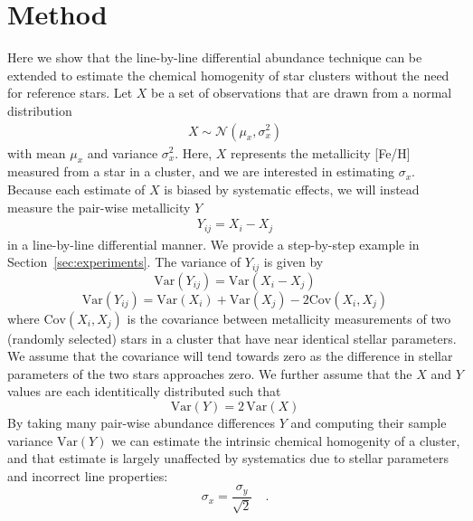 \documentclass[modern]{aastex631}
\begin{document}
\section{Method} \label{sec:method}
Here we show that the line-by-line differential abundance technique can be extended to estimate the chemical homogenity of star clusters without the need for reference stars. Let ${X}$ be a set of observations that are drawn from a normal distribution
\begin{eqnarray}
   X \sim \mathcal{N}(\mu_x, \sigma_x^2)
\end{eqnarray}
\noindent{}with mean $\mu_x$ and variance $\sigma_x^2$. Here, $X$ represents the metallicity [Fe/H] measured from a star in a cluster, and we are interested in estimating $\sigma_x$. Because each estimate of $X$ is biased by systematic effects, we will instead measure the pair-wise metallicity $Y$
\begin{eqnarray}
    Y_{ij} = X_i - X_j
\end{eqnarray}
\noindent{}in a line-by-line differential manner. We provide a step-by-step example in Section~\ref{sec:experiments}. The variance of $Y_{ij}$ is given by
\begin{equation}
    \mathrm{Var}(Y_{ij}) = \mathrm{Var}(X_i - X_j)
\end{equation}
\begin{equation}
    \mathrm{Var}(Y_{ij}) = \mathrm{Var}(X_i) + \mathrm{Var}(X_j) - 2\mathrm{Cov}(X_i,X_j)
\end{equation}
\noindent{}where $\mathrm{Cov}(X_i,X_j)$ is the covariance between metallicity measurements of two (randomly selected) stars in a cluster that have near identical stellar parameters. We assume that the covariance will tend towards zero as the difference in stellar parameters of the two stars approaches zero. We further assume that the $X$ and $Y$ values are each identitically distributed such that 
\begin{equation}
    \mathrm{Var}(Y) = 2\,\mathrm{Var}(X)
\end{equation}
By taking many pair-wise abundance differences $Y$ and computing their sample variance $\mathrm{Var}(Y)$ we can estimate the intrinsic chemical homogenity of a cluster, and that estimate is largely unaffected by systematics due to stellar parameters and incorrect line properties:
\begin{equation}
    \sigma_x = \frac{\sigma_y}{\sqrt{2}} \quad .
    \label{eq:sigma_x_to_sigma_y}
\end{equation}
\end{document}
